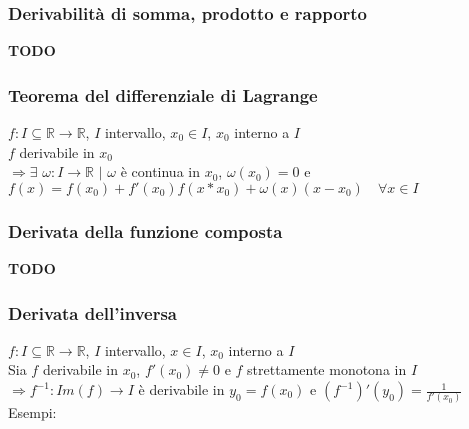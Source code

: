 \documentclass{article}
\begin{document}
\subsubsection{Derivabilità di somma, prodotto e rapporto}
\textbf{TODO}

\subsubsection{Teorema del differenziale di Lagrange}
$f: I \subseteq \mathbb{R} \to \mathbb{R}$, $I$ intervallo, $x_0 \in I$, $x_0$ interno a $I$\\
$f$ derivabile in $x_0$\\
$\Rightarrow \exists$ $\omega: I \to \mathbb{R}$ $|$ $\omega$ è continua in $x_0$, $\omega(x_0) = 0$ e $f(x) = f(x_0) + f'(x_0)f(x * x_0) + \omega(x)(x-x_0) \quad \forall x \in I$

\subsubsection{Derivata della funzione composta}
\textbf{TODO}
\subsubsection{Derivata dell'inversa}
$f:I \subseteq \mathbb{R} \to \mathbb{R}$, $I$ intervallo, $x \in I$, $x_0$ interno a $I$\\
Sia $f$ derivabile in $x_0$, $f'(x_0) \neq 0$ e $f$ strettamente monotona in $I$\\
$\Rightarrow f^{-1}: Im(f) \to I$ è derivabile in $y_0=f(x_0)$ e $(f^{-1})'(y_0) = \frac{1}{f'(x_0)}$
\bigbreak
\noindent Esempi:
\end{document}
